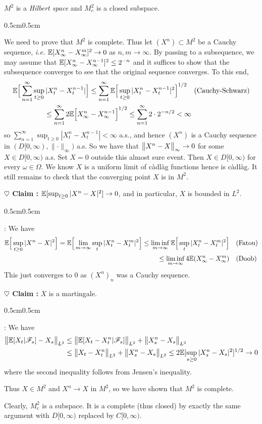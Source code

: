 \documentclass[12pt,a4paper]{article}
\newenvironment{proof}
{\begin{changemargin}{0.5cm}{0.5cm} 
	}%
	{\end{changemargin}
}
\newenvironment{subproof}
{\begin{changemargin}{0.5cm}{0.5cm} 
	}%
	{\end{changemargin}
}
\newenvironment{p}
{\begin{proof} 
	}%
	{\end{proof}
}
\begin{document}
\prop $M^2$ is a \emph{Hilbert space} and $M_c^2$ is a closed subspace.
\begin{p}
\pf We need to prove that $M^2$ is complete. Thus let $(X^n) \subset M^2$ be a Cauchy sequence, \textit{i.e.} $\mathbb{E}[X_{\infty}^n - X_{\infty}^m]^2 \rightarrow 0$ as $n,m\rightarrow \infty$. By passing to a subsequence, we may assume that $\mathbb{E}[X_{\infty}^n - X_{\infty}^{n-1}]^2 \leq 2^{-n}$ and it suffices to show that the subsequence converges to see that the original sequence converges. To this end,
\begin{align*}
\mathbb{E} \Big[ \sum_{n=1}^{\infty} \sup_{t\geq 0} |X_t^n - X_t^{n-1}| \Big] \leq \sum_{n=1}^{\infty} \mathbb{E} \Big[\sup_{t\geq 0} |X_t^n - X_t^{n-1}|^2 & \Big]^{1/2} \quad \text{(Cauchy-Schwarz)}\\
\leq \sum_{n=1}^{\infty} 2\mathbb{E} \Big[ X_{\infty}^n - X_{\infty}^{n-1}\Big]^{1/2} \leq \sum_{n=1}^{\infty} 2\cdot 2^{-n/2} & < \infty 
\end{align*}
so
$\sum_{n=1}^{\infty} \sup_{t\geq 0} |X_t^n - X_t^{n-1}|< \infty$ a.s., and hence $(X^n)$ is a Cauchy sequence in $(D[0, \infty),\parallel \cdot \parallel_{\infty})$ a.s. So we have that $\bigl\lVert X^n -X\bigr\rVert_{\infty} \rightarrow 0$ for some $X\in D[0, \infty)$ a.s. Set $X=0$ outside this almost sure event. Then $X\in D[0,\infty)$ for every $\omega \in \Omega$. We know $X$ is a uniform limit of c\`adl\`ag functions hence is c\`adl\`ag. It still remains to check that the converging point $X$ is in $M^2$.

\textbf{$\heartsuit$ Claim :} $\mathbb{E}[\sup_{t\geq 0} |X^n -X|^2] \rightarrow 0$, and in particular, $X$ is bounded in $L^2$.
\begin{subproof}
: We have
\begin{align*}
\mathbb{E} \Big[\sup_{t\geq 0}|X^n -X|^2 \Big] = \mathbb{E} \Big[ \lim_{m\rightarrow \infty} \sup_{t} |X_t^n -X_t^m|^2\Big] \leq \liminf_{m\rightarrow \infty}\mathbb{E}\Big[ \sup_t |X_t^n -X_t^{m}|^2\Big]& \quad \text{(Fatou)} \\
\leq \liminf_{m\rightarrow \infty} 4 \mathbb{E}(X_{\infty}^n -X_{\infty}^m)& \quad \text{(Doob)}
\end{align*}
This just converges to 0 as $(X^n)_n$ was a Cauchy sequence. 
\end{subproof}
\textbf{$\heartsuit$ Claim :} $X$ is a martingale.
\begin{subproof}
: We have
\begin{align*}
\bigl\lVert\mathbb{E}[X_t | \mathscr{F}_s] - X_s\bigr\rVert_{L^2}& \leq \bigl\lVert\mathbb{E}[X_t -X_t^n | \mathscr{F}_s]\bigr\rVert_{L^2} + \bigl\lVert X_s^n -X_s\bigr\rVert_{L^2} \\
&\leq \bigl\lVert X_t -X_t^n\bigr\rVert_{L^2} + \bigl\lVert X_s^n - X_s\bigr\rVert_{L^2} \leq 2\mathbb{E}[\sup_{s\geq 0}|X_s^n -X_s|^2]^{1/2} \rightarrow 0
\end{align*}
where the second inequality follows from Jensen's inequality.
\end{subproof}
Thus $X\in M^2$ and $X^n \rightarrow X$ in $M^2$, so we have shown that $M^2$ is complete.
\s

Clearly, $M_c^2$ is a subspace. It is a complete (thus closed) by exactly the same argument with $D[0, \infty)$ replaced by $C[0, \infty)$.

\eop
\end{p}
\end{document}
